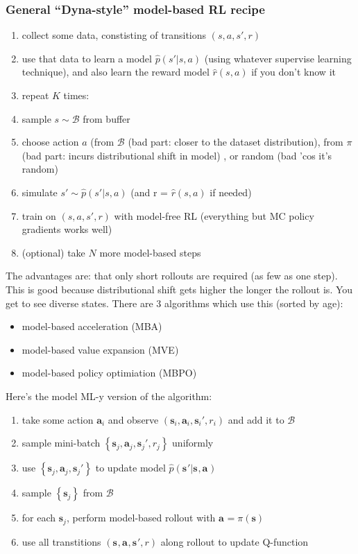 \documentclass{report}
\begin{document}
\subsubsection{General ``Dyna-style'' model-based RL recipe}
\begin{enumerate}
		\item collect some data, constisting of transitions $(s,a,s',r)$
		\item use that data to learn a model $\hat{p}(s'|s,a)$ (using whatever supervise learning technique), 
		and also learn the reward model $\hat{r}(s,a)$ if you don't know it
\item repeat $K$ times:
\item sample $s \sim \mathcal{B}$ from buffer
\item choose action $a$ (from $\mathcal{B}$ (bad part: closer to the dataset distribution), 
		from $\pi$ (bad part: incurs distributional shift in model) , or random (bad 'cos it's random)
\item simulate $s' \sim \hat{p}(s'|s,a)$ (and r = $\hat{r}(s,a)$ if needed)
\item train on $(s,a,s',r)$ with model-free RL (everything but MC policy gradients works well)
\item (optional) take $N$ more model-based steps
\end{enumerate}
The advantages are: that only short rollouts are required (as few as one step). 
This is good because distributional shift gets higher the longer the rollout is.
You get to see diverse states.
There are 3 algorithms which use this (sorted by age): 
\begin{itemize}
		\item model-based acceleration (MBA)
		\item model-based value expansion (MVE)
		\item model-based policy optimiation (MBPO)
\end{itemize}
Here's the model ML-y version of the algorithm:
\begin{enumerate}
		\item take some action $\bm{a}_{i}$ and observe $ \left( \bm{s}_{i}, \bm{a}_{i}, \bm{s}_{i}', r_i \right)   $ and add it to $ \mathcal{B}  $
		\item sample mini-batch $ \left\{  \bm{s}_{j}, \bm{a}_{j}, \bm{s}_{j}', r_j \right\}   $ uniformly
		\item use  $ \left\{  \bm{s}_{j}, \bm{a}_{j}, \bm{s}_{j}' \right\}   $ to update model $\hat{p} (\bm{s}_{}'|\bm{s}_{},\bm{a}_{})$
		\item sample $\left\{ \bm{s}_{j} \right\} $ from $ \mathcal{B}  $
		\item for each $\bm{s}_{j}$, perform model-based rollout with $\bm{a}_{} = \pi(\bm{s})$
		\item use all transtitions $ \left( \bm{s}_{}, \bm{a}_{}, \bm{s}_{}', r \right)   $ along rollout to update Q-function
\end{enumerate}
\end{document}

